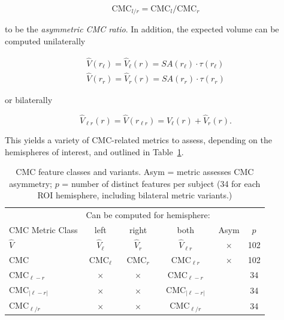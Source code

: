 \documentclass{article}
\begin{document}
\begin{equation} \label{eq:asym-ratio}
\text{CMC}_{l / r} = \text{CMC}_{l} / \text{CMC}_{r}
\end{equation}

to be the \emph{asymmetric CMC ratio}.  In addition, the expected volume can
be computed unilaterally

\begin{align} \label{eq:ev-unilateral}
\hat{V}(r_{\ell}) = \hat{V}_{\ell}(r) = SA(r_{\ell}) \cdot \tau(r_{\ell}) \\
\hat{V}(r_r) = \hat{V}_r(r) = SA(r_{r}) \cdot \tau(r_r)
\end{align}

or bilaterally

\begin{equation} \label{eq:ev-bilateral}
\hat{V}_{\ell r}(r) = \hat{V}(r_{\ell r}) = \hat{V}_{\ell}(r) + \hat{V}_r(r).
\end{equation}

This yields a variety of CMC-related metrics to assess, depending on the
hemispheres of interest, and outlined in Table~\ref{tab:cmc-variants}.

\begin{table}
\centering
\caption{CMC feature classes and variants. Asym = metric assesses CMC asymmetry; \(p\) = number of distinct features per subject (34 for each ROI hemisphere, including bilateral metric variants.)} \label{tab:cmc-variants}
\begin{tabular}{lccccc}
	\toprule

	                          &    \multicolumn{3}{c}{Can be computed for hemisphere:}  &       &      \\
  \cline{2-4}
	CMC Metric Class          &    left             &    right       & both             & Asym & $p$   \\
	\midrule
	$\hat{V}$                 & $\hat{V}_{\ell}$    & $\hat{V}_r$    & $\hat{V}_{\ell r}$        & $\times$   & 102 \\
	$\text{CMC}$              & $\text{CMC}_{\ell}$ & $\text{CMC}_r$ & $\text{CMC}_{\ell r}$     & $\times$   & 102 \\
	$\text{CMC}_{\ell - r}$   & $\times$            & $\times$       & $\text{CMC}_{\ell - r}$   & \checkmark &  34 \\
	$\text{CMC}_{|\ell - r|}$ & $\times$            & $\times$       & $\text{CMC}_{|\ell - r|}$ & \checkmark &  34 \\
	$\text{CMC}_{\ell / r}$   & $\times$            & $\times$       & $\text{CMC}_{\ell / r}$   & \checkmark &  34 \\
	\bottomrule
\end{tabular}
\end{table}
\end{document}
